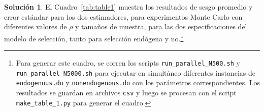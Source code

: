 \documentclass[12pt,letterpaper,reqno,oneside]{amsart}
\theoremstyle{problemstyle} %
\theoremstyle{definition} %
\newtheorem{solution}{Solución}[problem]
\DeclareMathOperator{\ar}{AR}
\begin{document}
\begin{solution}
  El Cuadro~\ref{tab:table1} muestra los resultados de sesgo promedio y error estándar para los dos estimadores, para experimentos Monte Carlo con diferentes valores de $\rho$ y tamaños de muestra, para las dos especificaciones del modelo de selección, tanto para selección endógena y no.\footnote{Para generar este cuadro, se corren los scripts \texttt{run\_parallel\_N500.sh} y \texttt{run\_parallel\_N5000.sh} para ejecutar en simultáneo diferentes instancias de \texttt{endogenous.do} y \texttt{nonendogenous.do} con los parámetros correspondientes. Los resultados se guardan en archivos \texttt{csv} y luego se procesan con el script \texttt{make\_table\_1.py} para generar el cuadro.}

  \begin{table}[htbp]
    \centering
    \caption{Sesgo promedio en el modelo $\ar(1)$ ($T = 7$, $500$~replicaciones)}
    \label{tab:table1}
    
  \end{table}


\end{solution}
\end{document}

